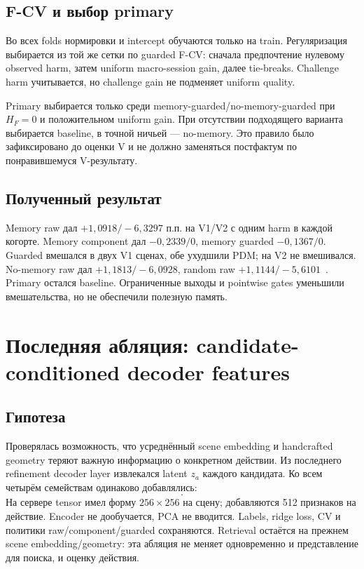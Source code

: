 \documentclass[11pt,a4paper]{article}
\begin{document}
\subsection{F-CV и выбор primary}
Во всех folds нормировки и intercept обучаются только на train. Регуляризация выбирается из той же сетки по guarded F-CV: сначала предпочтение нулевому observed harm, затем uniform macro-session gain, далее tie-breaks. Challenge harm учитывается, но challenge gain не подменяет uniform quality.

Primary выбирается только среди memory-guarded/no-memory-guarded при $H_F=0$ и положительном uniform gain. При отсутствии подходящего варианта выбирается baseline, в точной ничьей --- no-memory. Это правило было зафиксировано до оценки V и не должно заменяться постфактум по понравившемуся V-результату.

\subsection{Полученный результат}
Memory raw дал $+1{,}0918/-6{,}3297$ п.п. на V1/V2 с одним harm в каждой когорте. Memory component дал $-0{,}2339/0$, memory guarded $-0{,}1367/0$. Guarded вмешался в двух V1 сценах, обе ухудшили PDM; на V2 не вмешивался. No-memory raw дал $+1{,}1813/-6{,}0928$, random raw $+1{,}1144/-5{,}6101$~\cite{component}. Primary остался baseline. Ограниченные выходы и pointwise gates уменьшили вмешательства, но не обеспечили полезную память.

\section{Последняя абляция: candidate-conditioned decoder features}
\subsection{Гипотеза}
Проверялась возможность, что усреднённый scene embedding и handcrafted geometry теряют важную информацию о конкретном действии. Из последнего refinement decoder layer извлекался latent $z_a$ каждого кандидата. Ко всем четырём семействам одинаково добавлялись:
\begin{equation}
 [\,z_a,\ z_a-z_{a_0}\,].
\end{equation}
На сервере tensor имел форму $256\times256$ на сцену; добавляются 512 признаков на действие. Encoder не дообучается, PCA не вводится. Labels, ridge loss, CV и политики raw/component/guarded сохраняются. Retrieval остаётся на прежнем scene embedding/geometry: эта абляция не меняет одновременно и представление для поиска, и оценку действия.
\end{document}
